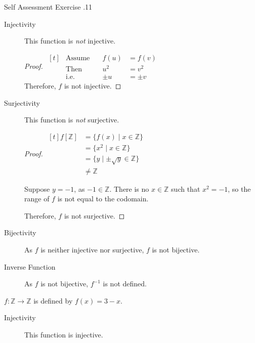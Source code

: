 \documentclass[\main/notes.tex]{subfiles}
\begin{document}
\begin{exercise}{Self Assessment Exercise \thechapter.11}
\begin{questions}
\begin{questions}
								\begin{answer}
									\begin{description}
										\item[Injectivity] This function is \emph{not} injective.
											\begin{proof}
												$ 
													\begin{aligned}[t]
														& \text{Assume} \quad &f(u) &= f(v)\\
														& \text{Then} & u^{2} &= v^{2}\\
														& \text{i.e.} & \pm u &= \pm v
													\end{aligned}
												$\\
												Therefore, $f$ is not injective.
											\end{proof}
										\item[Surjectivity] This function is \emph{not} surjective.
											\begin{proof}
												$ 
													\begin{aligned}[t]
														f[\mathbb{Z}] &= \{f(x) \mid x \in \mathbb{Z}\}\\
														&= \{x^{2} \mid x \in \mathbb{Z}\}\\
														&= \{y \mid \pm \sqrt{y} \in \mathbb{Z}\}\\
														& \neq \mathbb{Z}
													\end{aligned}
												$
												\begin{subproof}[Counterexample]
													Suppose $y = -1$, as $-1 \in \mathbb{Z}$. There is no $x \in \mathbb{Z}$ such that $x^{2} = -1$, so the range of $f$ is not equal to the codomain.
												\end{subproof}
												Therefore, $f$ is not surjective.
											\end{proof}
										\item[Bijectivity] As $f$ is neither injective nor surjective, $f$ is not bijective.
										\item[Inverse Function] As $f$ is not bijective, $f^{-1}$ is not defined. 
									\end{description}
								\end{answer}
							\pagebreak
							\item $f: \mathbb{Z} \rightarrow \mathbb{Z}$ is defined by $f(x) = 3 - x$.
								\begin{answer}
									\begin{description}
										\item[Injectivity] This function is injective.

\end{description}
\end{answer}
\end{questions}
\end{questions}
\end{exercise}
\end{document}
